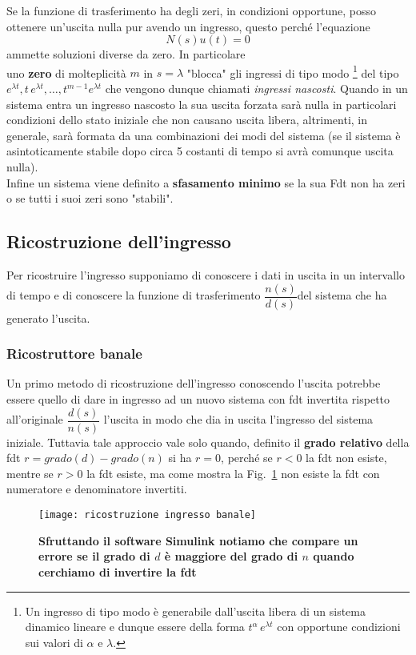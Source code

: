 \documentclass[a4paper]{article}
\begin{document}
	Se la funzione di trasferimento ha degli zeri, in condizioni opportune, posso ottenere un'uscita nulla pur avendo un ingresso, questo perché l'equazione \[N(s)u(t)=0\] ammette soluzioni diverse da zero.
	In particolare\newline \\
	uno \textbf{zero} di molteplicità $m$ in $s=\lambda$ "blocca" gli ingressi di tipo modo \footnote{Un ingresso di tipo modo è generabile dall'uscita libera di un sistema dinamico lineare e dunque essere della forma $t^\alpha\,e^{\lambda t}$ con opportune condizioni sui valori di $\alpha$ e $\lambda$.} del tipo $e^{\lambda t}, t\,e^{\lambda t}, \dots, t^{m-1}e^{\lambda t}$ che vengono dunque chiamati \textit{ingressi nascosti}. Quando in un sistema entra un ingresso nascosto la sua uscita forzata sarà nulla in particolari condizioni dello stato iniziale che non causano uscita libera, altrimenti, in generale, sarà formata da una combinazioni dei modi del sistema (se il sistema è asintoticamente stabile dopo circa 5 costanti di tempo si avrà comunque uscita nulla).
	\\
	Infine un sistema viene definito a \textbf{sfasamento minimo} se la sua Fdt non ha zeri o se tutti i suoi zeri sono "stabili".
	
	
	\subsection{Ricostruzione dell'ingresso}
	Per ricostruire l'ingresso supponiamo di conoscere i dati in uscita in un intervallo di tempo e di conoscere la funzione di trasferimento $\dfrac{n(s)}{d(s)}$del sistema che ha generato l'uscita.
	
	\subsubsection{Ricostruttore banale}
	Un primo metodo di ricostruzione dell'ingresso conoscendo l'uscita  potrebbe essere quello di dare in ingresso ad un nuovo sistema con fdt invertita rispetto all'originale $\dfrac{d(s)}{n(s)}$ l'uscita in modo che dia in uscita l'ingresso del sistema iniziale. Tuttavia tale approccio vale solo quando, definito il \textbf{grado relativo} della fdt $r=grado(d)-grado(n)$ si ha $r=0$, perché se $r<0$ la fdt non esiste, mentre se $r>0$ la fdt esiste, ma come mostra la Fig.~\ref{fdt impossibile} non esiste la fdt con numeratore e denominatore invertiti.
	\begin{figure}[htbp]
		\centering
		\texttt{[image: ricostruzione ingresso banale]}
		\caption{\textbf{Sfruttando il software Simulink notiamo che compare un errore se il grado di $d$ è maggiore del grado di $n$ quando cerchiamo di invertire la fdt}}\label{fdt impossibile}
	\end{figure}
	
\end{document}
